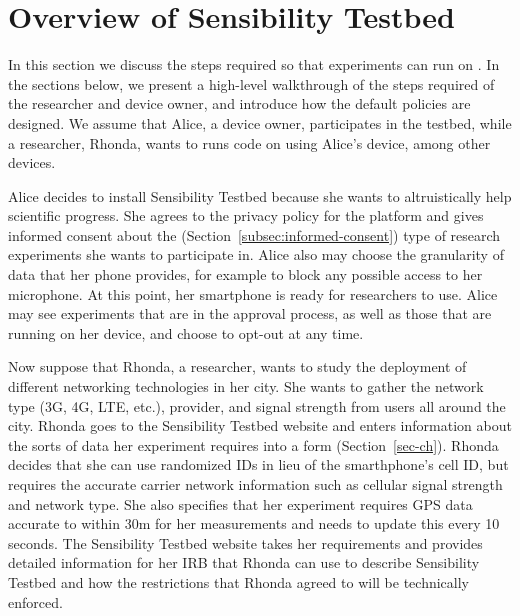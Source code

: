\section{Overview of Sensibility Testbed}\label{sec-overview}

In this section we discuss the steps required so that experiments 
can run on \sysname. 
%
In the sections below, we present a high-level walkthrough of the steps 
required of the researcher and device owner, and 
introduce how the default policies are designed. 
We assume that Alice, a device owner, participates in 
the testbed, while a researcher, Rhonda, wants to runs code on \sysname 
using Alice's device, among other devices.


Alice decides to install Sensibility Testbed because she wants to 
altruistically help scientific progress.  She agrees to the privacy
policy for the platform and gives informed consent about the (Section~\ref{subsec:informed-consent})
type of research experiments she wants to participate in.  Alice also
may choose the granularity of data that her phone provides, for 
example to block any possible access to her microphone.  At this point,
her smartphone is ready for researchers to use.  Alice may see experiments 
that are in the approval process, as
well as those that are running on her device, and choose
to opt-out at any time. 

Now suppose that Rhonda, a researcher, wants to study the deployment of
different networking technologies in her city.  She wants to gather
the network type (3G, 4G, LTE, etc.), provider, and signal strength from
users all around the city.  Rhonda goes to the Sensibility Testbed website
and enters information about the sorts of data her experiment requires
into a form (Section~\ref{sec-ch}).  Rhonda decides that she can use randomized IDs in lieu 
of the smarthphone's cell ID, but requires the accurate carrier 
network information such as cellular signal strength and network type. 
She also specifies that her experiment requires GPS data accurate to within
30m for her measurements and needs to update this every 10 seconds.
The Sensibility Testbed website takes her requirements and provides detailed
information for her IRB that Rhonda can use to describe Sensibility
Testbed and how the restrictions that Rhonda agreed to will be technically
enforced.

